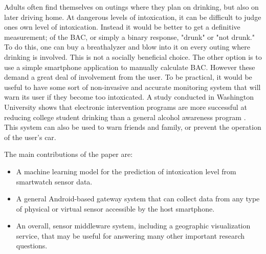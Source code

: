 Adults often find themselves on outings where they plan on drinking, but also on later driving home. At dangerous levels of intoxication, it can be difficult to judge ones own level of intoxication. Instead it would be better to get a definitive measurement; of the BAC, or simply a binary response, "drunk" or "not drunk." To do this, one can buy a breathalyzer and blow into it on every outing where drinking is involved. This is not a socially beneficial choice. The other option is to use a simple smartphone application to manually calculate BAC. However these demand a great deal of involvement from the user. To be practical, it would be useful to have some sort of non-invasive and accurate monitoring system that will warn its user if they become too intoxicated. A study conducted in Washington University shows that electronic intervention programs are more successful at reducing college student drinking than a general alcohol awareness program \cite{Ward:2015}. This system can also be used to warn friends and family, or prevent the operation of the user's car.

The main contributions of the paper are:

\begin{itemize}
	\item A machine learning model for the prediction of intoxication level from smartwatch sensor data.
	\item A general Android-based gateway system that can collect data from any type of physical or virtual sensor accessible by the host smartphone.
	\item An overall, sensor middleware system, including a geographic visualization service, that may be useful for answering many other important research questions.
\end{itemize}

